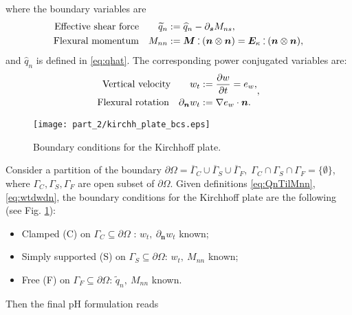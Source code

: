 where the boundary variables are 
\begin{subequations}
\label{eq:QnTilMnn}
\begin{align}
\text{Effective shear force}  \qquad \widetilde{q}_{n} &:= \widehat{q}_n - \partial_{\bm{s}}{M_{ns}},  \label{eq:effshearforce}\\
\text{Flexural momentum} \quad M_{nn} &:=  \bm{M} \cddot (\bm{n}\otimes{\bm{n}}) = \bm{E}_{\kappa} \cddot (\bm{n}\otimes{\bm{n}}),
\end{align}
\end{subequations}
and $\widehat{q}_n$ is defined in \eqref{eq:qhat}. The corresponding power conjugated variables are:
\begin{subequations}
\label{eq:wtdwdn}
\begin{align}
\text{Vertical velocity}  \qquad w_t &:= \diffp{w}{t} = e_w, \\
\text{Flexural rotation} \quad 
\partial_{\bm{n}}{w_t} &:= \nabla{e_w} \cdot \bm{n}.
\end{align},
\end{subequations}

\begin{figure}[tb]
	\centering
	\texttt{[image: part\_2/kirchh\_plate\_bcs.eps]}
	\caption{Boundary conditions for the Kirchhoff plate.}
	\label{fig:bcs_kirchh}
\end{figure}
Consider a partition of the boundary $\partial \Omega  = \overline{\Gamma}_{C} \cup \overline{\Gamma}_{S} \cup \overline{\Gamma}_{F}, \; {\Gamma}_{C} \cap {\Gamma}_{S} \cap {\Gamma}_{F} = \{\emptyset\}$, where ${\Gamma}_{C}, {\Gamma}_{S}, {\Gamma}_{F}$ are open subset of $\partial\Omega$. Given definitions \eqref{eq:QnTilMnn}, \eqref{eq:wtdwdn}, the boundary conditions for the Kirchhoff plate \cite{gustafsson2018} are the following (see Fig. \ref{fig:bcs_kirchh}):
\begin{itemize}
	\item Clamped (C) on $\Gamma_{C}\subseteq \partial \Omega$ : $w_t, \ \partial_{\bm{n}}{w_t}$ known;
	\item Simply supported (S) on $\Gamma_{S}\subseteq \partial \Omega$: $w_t, \ M_{nn}$ known;
	\item Free (F) on $\Gamma_{F}\subseteq \partial \Omega$: $\widetilde{q}_n, \ M_{nn}$ known.
\end{itemize}
Then the final pH formulation reads

